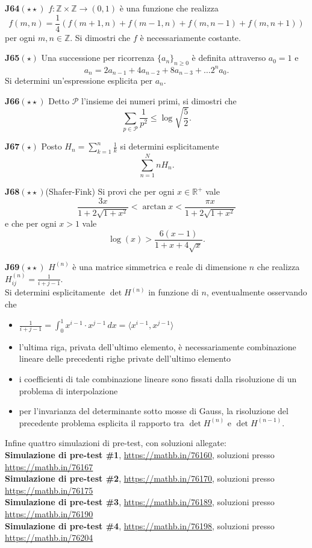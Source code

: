 \documentclass[a4paper,twoside]{article}
\theoremstyle{definition}
\numberwithin{theorem}{section}
\begin{document}
\textbf{J64}$(\star\star)$ $f:\mathbb{Z}\times\mathbb{Z}\to (0,1)$ è una funzione che realizza
$$ f(m,n) = \frac{1}{4}\left(f(m+1,n)+f(m-1,n)+f(m,n-1)+f(m,n+1)\right) $$
per ogni $m,n\in\mathbb{Z}$. Si dimostri che $f$ è necessariamente costante.

\textbf{J65}$(\star)$ Una successione per ricorrenza $\{a_n\}_{n\geq 0}$ è definita attraverso $a_0=1$ e 
$$ a_n = 2 a_{n-1} + 4 a_{n-2} + 8 a_{n-3}+\ldots 2^n a_{0}.$$
Si determini un'espressione esplicita per $a_n$.

\textbf{J66}$(\star\star)$ Detto $\mathcal{P}$ l'insieme dei numeri primi, si dimostri che 
$$ \sum_{p\in\mathcal{P}}\frac{1}{p^2} \leq \log\sqrt{\frac{5}{2}}.$$

\textbf{J67}$(\star)$ Posto $H_n=\sum_{k=1}^{n}\frac{1}{k}$ si determini esplicitamente
$$ \sum_{n=1}^{N} n H_n. $$

\textbf{J68}$(\star\star)$(Shafer-Fink) Si provi che per ogni $x\in\mathbb{R}^+$ vale 
$$ \frac{3x}{1+2\sqrt{1+x^2}} < \arctan x < \frac{\pi x}{1+2\sqrt{1+x^2}} $$ 
e che per ogni $x> 1$ vale
$$ \log(x) > \frac{6(x-1)}{1+x+4\sqrt{x}}. $$

\textbf{J69}$(\star\star)$ $H^{(n)}$ è una matrice simmetrica e reale di dimensione $n$ che realizza $H_{ij}^{(n)}=\frac{1}{i+j-1}$.\\ Si determini esplicitamente $\det H^{(n)}$ in funzione di $n$, eventualmente osservando che
\begin{itemize}
\item $\frac{1}{i+j-1}=\int_{0}^{1}x^{i-1}\cdot x^{j-1}\,dx = \langle x^{i-1}, x^{j-1}\rangle $
\item l'ultima riga, privata dell'ultimo elemento, è necessariamente combinazione lineare delle precedenti righe private dell'ultimo elemento
\item i coefficienti di tale combinazione lineare sono fissati dalla risoluzione di un problema di interpolazione 
\item per l'invarianza del determinante sotto mosse di Gauss, la risoluzione del precedente problema esplicita il rapporto tra $\det H^{(n)}$ e $\det H^{(n-1)}$.
\end{itemize}

Infine quattro simulazioni di pre-test, con soluzioni allegate:\\

\textbf{Simulazione di pre-test \#1}, \url{https://mathb.in/76160}, soluzioni presso \url{https://mathb.in/76167}\\
\textbf{Simulazione di pre-test \#2}, \url{https://mathb.in/76170}, soluzioni presso \url{https://mathb.in/76175}\\
\textbf{Simulazione di pre-test \#3}, \url{https://mathb.in/76189}, soluzioni presso \url{https://mathb.in/76190}\\
\textbf{Simulazione di pre-test \#4}, \url{https://mathb.in/76198}, soluzioni presso \url{https://mathb.in/76204}\\
\end{document}
